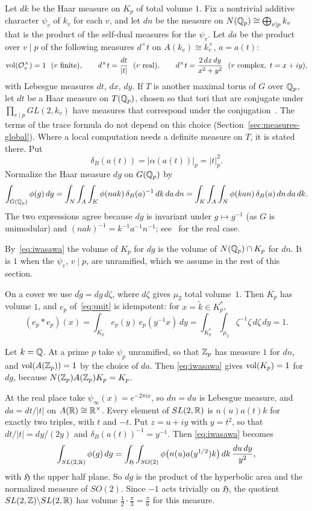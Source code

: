 Let $dk$ be the Haar measure on $K_p$ of total volume $1$. Fix a
nontrivial additive character $\psi_v$ of $k_v$ for each $v$, and let
$dn$ be the measure on $N(\mathbb{Q}_p)\cong\bigoplus_{v\mid p}k_v$ that is the
product of the self-dual measures for the $\psi_v$. Let $da$ be the
product over $v\mid p$ of the following measures $d^\times t$ on
$A(k_v)\cong k_v^\times$, $a=a(t)$:
\[
\vol(\OO_v^\times)=1\ \ (v\ \text{finite}),\qquad
d^\times t=\frac{dt}{|t|}\ \ (v\ \text{real}),\qquad
d^\times t=\frac{2\,dx\,dy}{x^2+y^2}\ \ (v\ \text{complex},\ t=x+iy),
\]
with Lebesgue measures $dt$, $dx$, $dy$. If $T$ is another maximal torus
of $G$ over $\mathbb{Q}_p$, let $dt$ be a Haar measure on $T(\mathbb{Q}_p)$, chosen so
that tori that are conjugate under $\prod_{v\mid p}GL(2,k_v)$ have
measures that correspond under the conjugation~\cite{Ro90}. The
terms of the trace formula do not depend on this choice
(Section~\ref{sec:measures-global}). Where a local computation needs a
definite measure on $T$, it is stated there. Put
\[
\delta_B(a(t))=|\alpha(a(t))|_p=|t|_p^2.
\]
Normalize the Haar measure $dg$ on $G(\mathbb{Q}_p)$ by
\begin{equation}\label{eq:iwasawa}
\int_{G(\mathbb{Q}_p)}\phi(g)\,dg
=\int_{N}\int_{A}\int_{K}\phi(nak)\,\delta_B(a)^{-1}\,dk\,da\,dn
=\int_{K}\int_{A}\int_{N}\phi(kan)\,\delta_B(a)\,dn\,da\,dk.
\end{equation}
The two expressions agree because $dg$ is invariant under
$g\mapsto g^{-1}$ (as $G$ is unimodular) and $(nak)^{-1}=k^{-1}a^{-1}
n^{-1}$; see~\cite[Ch.~VIII]{Kn02} for the real case.

By~\eqref{eq:iwasawa} the volume of $K_p$ for $dg$ is the volume of
$N(\mathbb{Q}_p)\cap K_p$ for $dn$. It is $1$ when the $\psi_v$, $v\mid p$, are
unramified, which we assume in the rest of this section.

On a cover we use $d\tilde g=dg\,d\zeta$, where $d\zeta$ gives
$\mu_2$ total volume~$1$. Then $\overline{K_p}$ has volume $1$, and
$e_p$ of~\eqref{eq:unit} is idempotent: for $x=\tilde k\in K_p^*$,
\[
(e_p*e_p)(x)=\int_{\overline{K_p}}e_p(y)\,e_p(y^{-1}x)\,dy
=\int_{K_p^*}\int_{\mu_2}\zeta^{-1}\zeta\,d\zeta\,dy=1.
\]

\begin{example}\label{ex:measure-real}
Let $k=\mathbb{Q}$. At a prime $p$ take $\psi_p$ unramified, so that $\mathbb{Z}_p$ has
measure $1$ for $dn$, and $\operatorname{vol}(A(\mathbb{Z}_p))=1$ by the choice of $da$. Then
\eqref{eq:iwasawa} gives $\operatorname{vol}(K_p)=1$ for $dg$, because
$N(\mathbb{Z}_p)A(\mathbb{Z}_p)K_p=K_p$.

At the real place take $\psi_\infty(x)=e^{-2\pi ix}$, so $dn=du$ is
Lebesgue measure, and $da=dt/|t|$ on $A(\mathbb{R})\cong\mathbb{R}^\times$. Every
element
of $SL(2,\mathbb{R})$ is $n(u)a(t)k$ for exactly two triples, with $t$ and $-t$.
Put $z=u+iy$ with $y=t^2$, so that $dt/|t|=dy/(2y)$ and
$\delta_B(a(t))^{-1}=y^{-1}$. Then \eqref{eq:iwasawa} becomes
\[
\int_{SL(2,\mathbb{R})}\phi(g)\,dg=\int_{\mathfrak H}\int_{SO(2)}
\phi\bigl(n(u)a(y^{1/2})k\bigr)\,dk\,\frac{du\,dy}{y^2},
\]
with $\mathfrak H$ the upper half plane. So $dg$ is the product of the
hyperbolic area and the normalized measure of $SO(2)$. Since $-1$ acts
trivially on $\mathfrak H$, the quotient $SL(2,\mathbb{Z})\backslash SL(2,\mathbb{R})$ has
volume $\frac12\cdot\frac\pi3=\frac\pi6$ for this measure.
\end{example}

